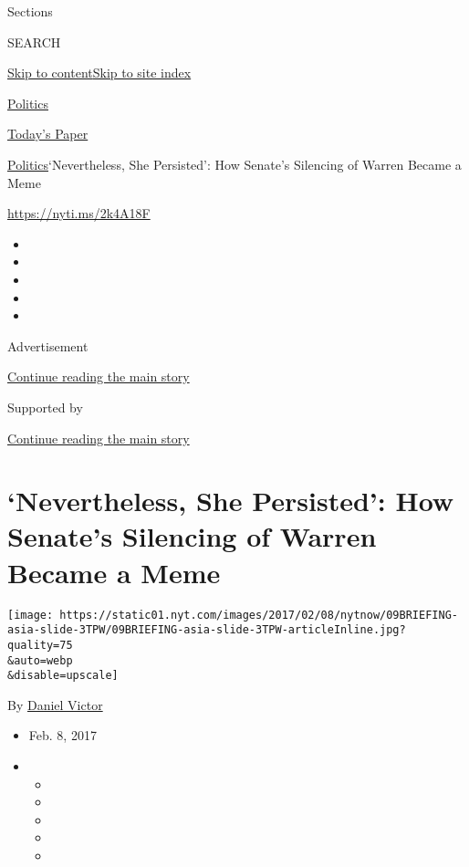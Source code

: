 Sections

SEARCH

\protect\hyperlink{site-content}{Skip to
content}\protect\hyperlink{site-index}{Skip to site index}

\href{https://www.nytimes.com/section/politics}{Politics}

\href{https://myaccount.nytimes.com/auth/login?response_type=cookie\&client_id=vi}{}

\href{https://www.nytimes.com/section/todayspaper}{Today's Paper}

\href{/section/politics}{Politics}\textbar{}`Nevertheless, She
Persisted': How Senate's Silencing of Warren Became a Meme

\url{https://nyti.ms/2k4A18F}

\begin{itemize}
\item
\item
\item
\item
\item
\end{itemize}

Advertisement

\protect\hyperlink{after-top}{Continue reading the main story}

Supported by

\protect\hyperlink{after-sponsor}{Continue reading the main story}

\hypertarget{nevertheless-she-persisted-how-senates-silencing-of-warren-became-a-meme}{%
\section{`Nevertheless, She Persisted': How Senate's Silencing of Warren
Became a
Meme}\label{nevertheless-she-persisted-how-senates-silencing-of-warren-became-a-meme}}

\texttt{[image: https://static01.nyt.com/images/2017/02/08/nytnow/09BRIEFING-asia-slide-3TPW/09BRIEFING-asia-slide-3TPW-articleInline.jpg?quality=75\\\&auto=webp\\\&disable=upscale]}

By \href{http://www.nytimes.com/by/daniel-victor}{Daniel Victor}

\begin{itemize}
\item
  Feb. 8, 2017
\item
  \begin{itemize}
  \item
  \item
  \item
  \item
  \item
  \end{itemize}
\end{itemize}

